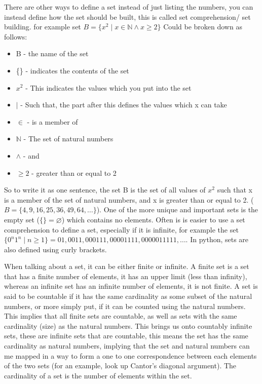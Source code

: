  There are other ways to define a set instead of just listing the numbers, you can instead define how the set should be built, this is called set comprehension/ set building. for example set $B=\{x^2 \mid x\in\mathbb{N} \wedge x \geq 2\}$
  Could be broken down as follows:
  \begin{itemize}
  	\item B - the name of the set
  	\item \{\} - indicates the contents of the set
  	\item $x^2$ - This indicates the values which you put into the set
  	\item $\mid$ - Such that, the part after this defines the values which x can take
  	\item $\in$ - is a member of
	\item $\mathbb{N}$ - The set of natural numbers
	\item $\wedge$ - and 
	\item $\geq2$ - greater than or equal to 2
  \end{itemize}
  So to write it as one sentence, the set B is the set of all values of $x^2$ such that x is a member of the set of natural numbers, and x is greater than or equal to 2. ($B=\{4,9,16,25,36,49,64,\dots\}$). One of the more unique and important sets is the empty set ($\{\} = \varnothing$) which contains no elements. Often is is easier to use a set comprehension to define a set, especially if it is infinite, for example the set $\{0^n1^n \mid n \geq 1\} = {01,0011,000111,00001111,0000011111,\dots}$. In python, sets are also defined using curly brackets.
  
When talking about a set, it can be either finite or infinite. A finite set is a set that has a finite number of elements, it has an upper limit (less than infinity), whereas an infinite set has an infinite number of elements, it is not finite. A set is said to be countable if it has the same cardinality as some subset of the natural numbers, or more simply put, if it can be counted using the natural numbers. This implies that all finite sets are countable, as well as sets with the same cardinality (size) as the natural numbers. This brings us onto countably infinite sets, these are infinite sets that are countable, this means the set has the same cardinality as natural numbers, implying that the set and natural numbers can me mapped in a way to form a one to one correspondence between each elements of the two sets (for an example, look up Cantor's diagonal argument). The cardinality of a set is the number of elements within the set.
  
